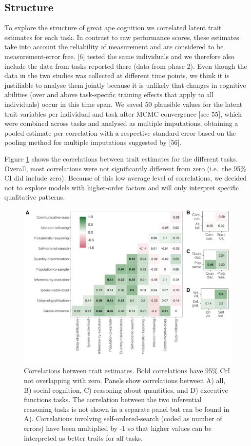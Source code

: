 \documentclass[
  man,floatsintext]{apa6}
\begin{document}
\subsection{Structure}\label{structure}

To explore the structure of great ape cognition we correlated latent trait estimates for each task. In contrast to raw performance scores, these estimates take into account the reliability of measurement and are considered to be measurement-error free. {[}6{]} tested the same individuals and we therefore also include the data from tasks reported there (data from phase 2). Even though the data in the two studies was collected at different time points, we think it is justifiable to analyse them jointly because it is unlikely that changes in cognitive abilities (over and above task-specific training effects that apply to all individuals) occur in this time span. We saved 50 plausible values for the latent trait variables per individual and task after MCMC convergence {[}see 55{]}, which were combined across tasks and analysed as multiple imputations, obtaining a pooled estimate per correlation with a respective standard error based on the pooling method for multiple imputations suggested by {[}56{]}.

Figure \ref{fig:figcor} shows the correlations between trait estimates for the different tasks. Overall, most correlations were not significantly different from zero (i.e.~the 95\% CI did include zero). Because of this low average level of correlations, we decided not to explore models with higher-order factors and will only interpret specific qualitative patterns.

\begin{figure}

{\centering \includegraphics[width=0.7\linewidth]{../visuals/task_level_cor} 

}

\caption{Correlations between trait estimates. Bold correlations have 95\% CrI not overlapping with zero. Panels show correlations between A) all, B) social cognition, C) reasoning about quantities, and D) executive functions tasks. The correlation between the two inferential reasoning tasks is not shown in a separate panel but can be found in A). Correlations involving self-ordered-search (coded as number of errors) have been multiplied by -1 so that higher values can be interpreted as better traits for all tasks.}\label{fig:figcor}
\end{figure}
\end{document}
